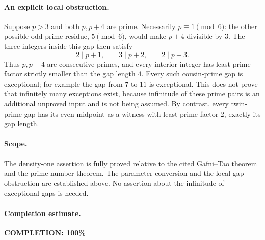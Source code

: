 \paragraph{An explicit local obstruction.}
Suppose \(p>3\) and both \(p,p+4\) are prime.
Necessarily \(p\equiv1\pmod6\): the other possible odd prime
residue, \(5\pmod6\), would make \(p+4\) divisible by \(3\).
The three integers inside this gap then satisfy
\[
 2\mid p+1,\qquad 3\mid p+2,\qquad 2\mid p+3.
\]
Thus \(p,p+4\) are consecutive primes, and every interior
integer has least prime factor strictly smaller than the
gap length \(4\). Every such cousin-prime gap is exceptional;
for example the gap from \(7\) to \(11\) is exceptional.
This does not prove that infinitely many exceptions exist,
because infinitude of these prime pairs is an additional
unproved input and is not being assumed.
By contrast, every twin-prime gap has its even midpoint as
a witness with least prime factor \(2\), exactly its gap length.

\paragraph{Scope.}
The density-one assertion is fully proved relative to the cited
Gafni--Tao theorem and the prime number theorem. The parameter
conversion and the local gap obstruction are established above.
No assertion about the infinitude of exceptional gaps is needed.

\paragraph{Completion estimate.}
\textbf{COMPLETION: 100\%}
